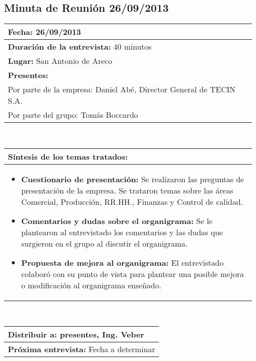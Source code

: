 \subsection{Minuta de Reunión 26/09/2013}
\begin{flushleft}
	\begin{tabular}{|p{15cm}|}
		\hline
		\textbf{Fecha:} 26/09/2013 \\ \hline
		\textbf{Duración de la entrevista:} 40 minutos\\ \hline
		\textbf{Lugar:} San Antonio de Areco\\ \hline
		\textbf{Presentes:} \\
			Por parte de la empresa: Daniel Abé, Director General de TECIN S.A. \\ 
			Por parte del grupo: Tomás Boccardo \\ \hline
	\end{tabular}  \\
	\vspace{0.7cm}
	\begin{tabular}{|p{15cm}|}
		\hline
		\textbf{Síntesis de los temas tratados:}\\
		\hline
		\begin{itemize}
			\item \textbf{Cuestionario de presentación:}
			Se realizaron las preguntas de presentación de la empresa. Se trataron temas sobre las áreas Comercial, Producción, RR.HH., Finanzas y Control de calidad.

		\item \textbf{Comentarios y dudas sobre el organigrama:} 
		Se le plantearon al entrevistado los comentarios y las dudas que surgieron en el grupo al discutir el organigrama.

		\item \textbf{Propuesta de mejora al organigrama:} El entrevistado colaboró con su punto de vista para plantear una posible mejora o modificación al organigrama enseñado.

		\end{itemize} \\ \hline
	\end{tabular} \\
	\vspace{0.7cm}
	\begin{tabular}{|p{15cm}|}                
		\hline 
		\textbf{Distribuir a:} presentes, Ing. Veber\\
		\hline
		\textbf{Próxima entrevista:} Fecha a determinar\\
		\hline
	\end{tabular}	
	
\end{flushleft}